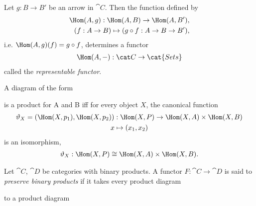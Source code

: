 \documentclass{article}
\begin{document}
\begin{theorem}
	Let $g:B\to B'$ be an arrow in $\cat C$. Then the function
	defined by
	\begin{align*}
		\Hom(A, g):\Hom(A,B)\to\Hom(A,B'), \\
		(f:A\to B) \mapsto (g\circ f:A\to B\to B'),
	\end{align*}
	i.e. $\Hom(A,g)(f)=g\circ f$, determines a functor
	\begin{align*}
		\Hom(A,-):\cat C \to \cat{Sets}
	\end{align*}
	called the \emph{representable functor}.
\end{theorem}

\begin{proposition}[Awodey 2.20]
	A diagram of the form
	\begin{center}
	\end{center}
	is a product for A and B iff for every object $X$, the canonical
	function
	\begin{gather*}
		\vartheta_X = (\Hom(X, p_1), \Hom(X, p_2)) : \Hom(X, P)\to \Hom(X,A)\times \Hom(X,B)\\
		x \mapsto (x_1, x_2)
	\end{gather*}
	is an isomorphism,
	\begin{align*}
		\vartheta_X:\Hom(X,P)\cong \Hom(X,A)\times\Hom(X,B).
	\end{align*}
\end{proposition}

\begin{definition}[Awodey 2.21]
	Let $\cat C$, $\cat D$ be categories with binary products. A functor
	$F:\cat C\to \cat D$ is said to \emph{preserve binary products} if it takes
	every product diagram
	\begin{center}
	\end{center}
	to a product diagram
	\begin{center}
	\end{center}
\end{definition}
\end{document}
